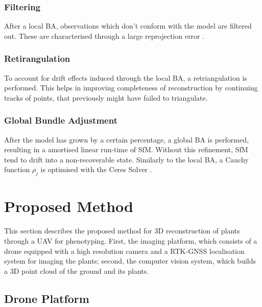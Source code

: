 \documentclass[conference,]{IEEEtran}
\begin{document}
\hypertarget{filtering}{%
\subsubsection{Filtering}\label{filtering}}

After a local BA, observations which don't conform with the model are
filtered out. These are characterised through a large reprojection error
\autocite{wu2013}. \autocite{schönberger2016}

\hypertarget{retirangulation}{%
\subsubsection{Retirangulation}\label{retirangulation}}

To account for drift effects induced through the local BA, a
retriangulation is performed. This helps in improving completeness of
reconstruction by continuing tracks of points, that previously might
have failed to triangulate. \autocite{schönberger2016}

\hypertarget{global-bundle-adjustment}{%
\subsubsection{Global Bundle
Adjustment}\label{global-bundle-adjustment}}

After the model has grown by a certain percentage, a global BA is
performed, resulting in a amortised linear run-time of SfM. Without this
refinement, SfM tend to drift into a non-recoverable state. Similarly to
the local BA, a Cauchy function \(\rho_j\) is optimised with the Ceres
Solver \autocite{ceresso}. \autocite{schönberger2016}

\hypertarget{proposed-method}{%
\section{Proposed Method}\label{proposed-method}}

This section describes the proposed method for 3D reconstruction of
plants through a UAV for phenotyping. First, the imaging platform, which
consists of a drone equipped with a high resolution camera and a
RTK-GNSS localisation system for imaging the plants; second, the
computer vision system, which builds a 3D point cloud of the ground and
its plants.

\hypertarget{sec-drone}{%
\subsection{Drone Platform}\label{sec-drone}}
\end{document}
